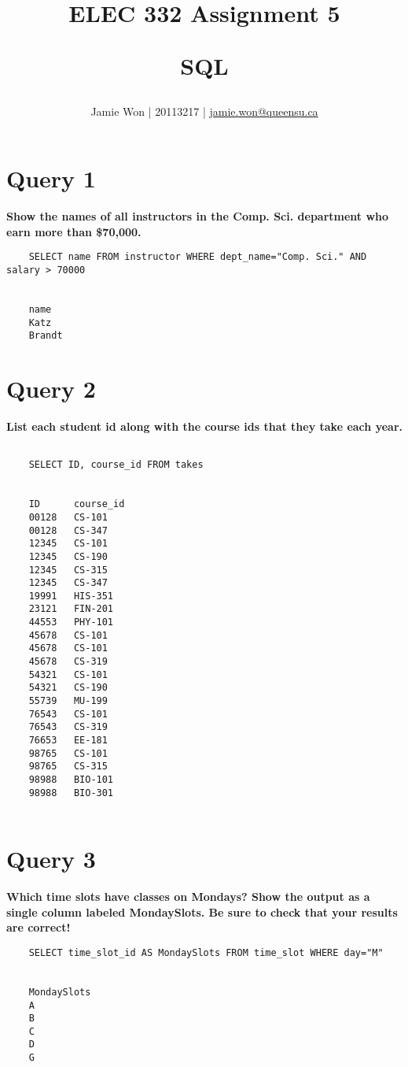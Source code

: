 \documentclass[letterpaper]{article}
\title{
    ELEC 332 Assignment 5 \\
    \begin{large}
        SQL
    \end{large}
}
\author{Jamie Won | 20113217 | \href{mailto:jamie.won@queensu.ca}{jamie.won@queensu.ca}}
\begin{document}
\maketitle
\tableofcontents

\cleardoublepage

\section{Query 1}

    \textbf{Show the names of all instructors in the Comp. Sci. department who earn more than \$70,000.}
    \begin{lstlisting}
    SELECT name FROM instructor WHERE dept_name="Comp. Sci." AND salary > 70000


    name	
    Katz	
    Brandt	
    \end{lstlisting}
        
\section{Query 2}

    \textbf{List each student id along with the course ids that they take each year.}
    \begin{lstlisting}
       
    SELECT ID, course_id FROM takes
    
    
    ID	    course_id	
    00128	CS-101	
    00128	CS-347	
    12345	CS-101	
    12345	CS-190	
    12345	CS-315	
    12345	CS-347	
    19991	HIS-351	
    23121	FIN-201	
    44553	PHY-101	
    45678	CS-101	
    45678	CS-101	
    45678	CS-319	
    54321	CS-101	
    54321	CS-190	
    55739	MU-199	
    76543	CS-101	
    76543	CS-319	
    76653	EE-181	
    98765	CS-101	
    98765	CS-315	
    98988	BIO-101	
    98988	BIO-301	
       
    \end{lstlisting}
        
\section{Query 3}

    \textbf{Which time slots have classes on Mondays?  Show the output as a single column labeled MondaySlots.  Be sure to check that your results are correct!}
    \begin{lstlisting}
    SELECT time_slot_id AS MondaySlots FROM time_slot WHERE day="M"


    MondaySlots	
    A	
    B	
    C	
    D	
    G	
    \end{lstlisting}
        
\end{document}
